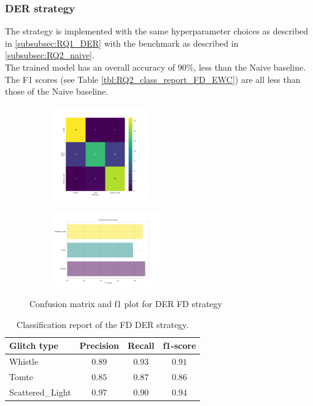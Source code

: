 \subsubsection{DER strategy}
\label{subsubsec:RQ2_der}

The strategy is implemented with the same hyperparameter choices as described in \ref{subsubsec:RQ1_DER} with the benchmark as described in \ref{subsubsec:RQ2_naive}. \\
The trained model has an overall accuracy of $90\%$, less than the Naive baseline. The F1 scores (see Table \ref{tbl:RQ2_class_report_FD_EWC}) are all less than those of the Naive baseline. 

\begin{figure}[H]
\centering
\begin{subfigure}
  \centering
  \includegraphics[width=0.45\textwidth]{Images/cm_FD_model_DER.png}  
  \label{fig:fd_sub-first8}
\end{subfigure}
\begin{subfigure}
  \centering
  \includegraphics[width=0.50\textwidth]{Images/f1_FD_model_DER.png}  
  \label{fig:fd_sub-second8}
\end{subfigure}
\caption{Confusion matrix and f1 plot for DER FD strategy}
\label{fig:cm_f1_FD_DER}
\end{figure}

\begin{table}[ht]
\centering
    \begin{tabular}{|l|c c c|}
    \hline
    \textbf{Glitch type} & \textbf{Precision} & \textbf{Recall} & \textbf{f1-score} \\ \hline
    Whistle & $0.89$ & $0.93$ & $0.91$ \\
    Tomte & $0.85$ & $0.87$ & $0.86$ \\
    Scattered\_Light & $0.97$ & $0.90$ & $0.94$ \\
    \hline
    \end{tabular}
    \caption{Classification report of the FD DER strategy.}
    \label{tbl:RQ2_class_report_FD_DER}
\end{table}

